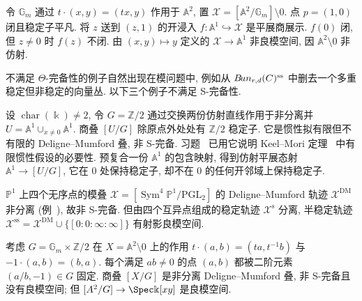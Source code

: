 \begin{example}\label{src:7.10.4}
令 $\mathbb G_m$ 通过 $t\cdot(x,y)=(tx,y)$ 作用于 $\mathbb A^2$, 置 $\mathcal X=[\mathbb A^2/\mathbb G_m]\setminus0$. 点 $p=(1,0)$ 闭且稳定子平凡. 将 $z$ 送到 $(z,1)$ 的开浸入 $f:\mathbb A^1\hookrightarrow\mathcal X$ 是平展商展示. $f(0)$ 闭, 但 $z\ne0$ 时 $f(z)$ 不闭. 由 $(x,y)\mapsto y$ 定义的 $\mathcal X\to\mathbb A^1$ 非良模空间, 因 $\mathbb A^2\setminus0$ 非仿射.
\end{example}
不满足 $\Theta$-完备性的例子自然出现在模问题中, 例如从 $B\!un_{r,d}(C)^{\mathrm{ss}}$ 中删去一个多重稳定但非稳定的向量丛. 以下三个例子不满足 S-完备性.
\begin{example}\label{src:7.10.5}
设 $\operatorname{char}(\Bbbk)\ne2$, 令 $G=\mathbb Z/2$ 通过交换两份仿射直线作用于非分离并 $U=\mathbb A^1\cup_{x\ne0}\mathbb A^1$. 商叠 $[U/G]$ 除原点外处处有 $\mathbb Z/2$ 稳定子. 它是惯性拟有限但不有限的 Deligne--Mumford 叠, 非 S-完备. 习题~ 已用它说明 Keel--Mori 定理~ 中有限惯性假设的必要性. 预复合一份 $\mathbb A^1$ 的包含映射, 得到仿射平展态射 $\mathbb A^1\to[U/G]$, 它在 $0$ 处保持稳定子, 却不在 $0$ 的任何开邻域上保持稳定子.
\end{example}
\begin{example}\label{src:7.10.6}
$\mathbb P^1$ 上四个无序点的模叠 $\mathcal X=[\operatorname{Sym}^4\mathbb P^1/\mathrm{PGL}_2]$ 的 Deligne--Mumford 轨迹 $\mathcal X^{\mathrm{DM}}$ 非分离 (例~), 故非 S-完备. 但由四个互异点组成的稳定轨迹 $\mathcal X^{\mathrm{s}}$ 分离, 半稳定轨迹 $\mathcal X^{\mathrm{ss}}=\mathcal X^{\mathrm{DM}}\cup\{[0:0:\infty:\infty]\}$ 有射影良模空间.
\end{example}
\begin{example}\label{src:7.10.7}
考虑 $G=\mathbb G_m\times\mathbb Z/2$ 在 $X=\mathbb A^2\setminus0$ 上的作用 $t\cdot(a,b)=(ta,t^{-1}b)$ 与 $-1\cdot(a,b)=(b,a)$. 每个满足 $ab\ne0$ 的点 $(a,b)$ 都被二阶元素 $(a/b,-1)\in G$ 固定. 商叠 $[X/G]$ 是非分离 Deligne--Mumford 叠, 非 S-完备且没有良模空间; 但 $[\mathbb A^2/G]\to\Spec\Bbbk[xy]$ 是良模空间.
\end{example}
